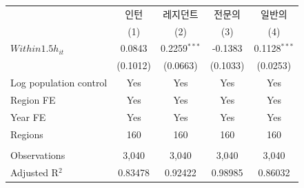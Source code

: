 \begingroup
\centering
\begin{tabular}{lcccc}
   \toprule
                          & 인턴     & 레지던트       & 전문의   & 일반의 \\   
                          & (1)      & (2)            & (3)      & (4)\\  
   \midrule 
   $Within1.5h_{it}$      & 0.0843   & 0.2259$^{***}$ & -0.1383  & 0.1128$^{***}$\\   
                          & (0.1012) & (0.0663)       & (0.1033) & (0.0253)\\   
   Log population control & Yes      & Yes            & Yes      & Yes\\  
   Region FE              & Yes      & Yes            & Yes      & Yes\\  
   Year FE                & Yes      & Yes            & Yes      & Yes\\  
   Regions                & 160      & 160            & 160      & 160\\  
    \\
   Observations           & 3,040    & 3,040          & 3,040    & 3,040\\  
   Adjusted R$^2$         & 0.83478  & 0.92422        & 0.98985  & 0.86032\\  
   \bottomrule
\end{tabular}
\par\endgroup
